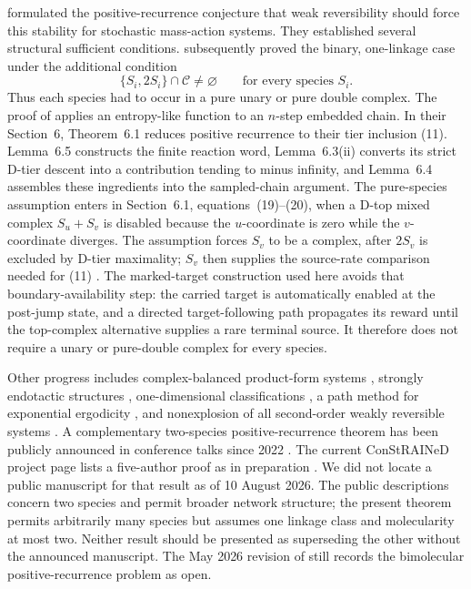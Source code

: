 \citet{AndersonKim2018} formulated the positive-recurrence conjecture that
weak reversibility should force this stability for stochastic mass-action
systems.  They established several structural sufficient conditions.
\citet{AndersonCappellettiKim2020} subsequently proved the binary,
one-linkage case under the additional condition
\begin{equation}\label{eq:ACK-condition}
  \{S_i,2S_i\}\cap\mathcal C\ne\varnothing
  \qquad\text{for every species }S_i.
\end{equation}
Thus each species had to occur in a pure unary or pure double complex.  The
proof of \citet{AndersonCappellettiKim2020} applies an entropy-like
function to an \(n\)-step embedded chain.  In their Section~6, Theorem~6.1
reduces positive recurrence to their tier inclusion (11).  Lemma~6.5
constructs the finite reaction word, Lemma~6.3(ii) converts its strict D-tier
descent into a contribution tending to minus infinity, and Lemma~6.4 assembles
these ingredients into the sampled-chain argument.  The pure-species
assumption enters in Section~6.1, equations~(19)--(20), when a D-top mixed
complex \(S_u+S_v\) is disabled because the \(u\)-coordinate is zero while
the \(v\)-coordinate diverges.  The assumption forces \(S_v\) to be a complex,
after \(2S_v\) is excluded by D-tier maximality; \(S_v\) then supplies the
source-rate comparison needed for (11)
\citep[Section~6; Theorem~6.1; Lemmas~6.3--6.5; Section~6.1;
equations~(19)--(20)]{AndersonCappellettiKim2020}.  The marked-target
construction used here avoids that boundary-availability step: the carried
target is automatically enabled at the post-jump state, and a directed
target-following path propagates its reward until the top-complex alternative
supplies a rare terminal source.  It therefore does not require a unary or
pure-double complex for every species.

Other progress includes complex-balanced product-form systems
\citep{AndersonCraciunKurtz2010}, strongly endotactic structures
\citep{AndersonCappellettiKimNguyen2020}, one-dimensional classifications
\citep{WiufXu2023}, a path method for exponential ergodicity
\citep{AndersonCappellettiFanKim2025}, and nonexplosion of all second-order
weakly reversible systems \citep{Xu2026}.  A complementary two-species
positive-recurrence theorem has been publicly announced in conference talks
since 2022 \citep{Agazzi2022Talk,Agazzi2025Talk}.  The current ConStRAINeD
project page lists a five-author proof as in preparation
\citep{ConStRAINeDResults}.  We did not locate a public manuscript for that
result as of 10 August 2026.  The public descriptions concern two species and
permit broader network structure; the present theorem permits arbitrarily many
species but assumes one linkage class and molecularity at most two.  Neither
result should be presented as superseding the other without the announced
manuscript.  The May 2026
revision of \citet{Xu2026} still records the bimolecular positive-recurrence
problem as open.

